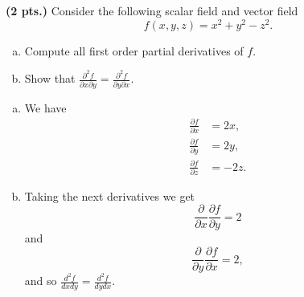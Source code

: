 \documentclass[12pt]{article} %
\begin{document}
\newpage
\begin{problem}
\textbf{(2 pts.)} Consider the following scalar field and vector field
\[
f(x,y,z) = x^2+y^2-z^2.
\]
\begin{enumerate}[(a)]
    \item Compute all first order partial derivatives of $f$.
    \item Show that $\frac{\partial^2 f}{\partial x \partial y} = \frac{\partial^2 f}{\partial y \partial x}$.
\end{enumerate}
\end{problem}
\begin{solution}
\begin{enumerate}[(a)]
    \item We have
    \begin{align*}
        \frac{\partial f}{\partial x} &= 2x, \\
        \frac{\partial f}{\partial y} &= 2y, \\
        \frac{\partial f}{\partial z} &= -2z.
    \end{align*}
    \item Taking the next derivatives we get
    \[
        \frac{\partial }{\partial x} \frac{\partial f}{\partial y} = 2
    \]
    and
    \[
        \frac{\partial}{\partial y}\frac{\partial f}{\partial x} = 2,
    \]
    and so $\frac{d^2 f}{d x d y} = \frac{d^2 f}{d y d x}$.


\end{enumerate}
\end{solution}
\end{document}
